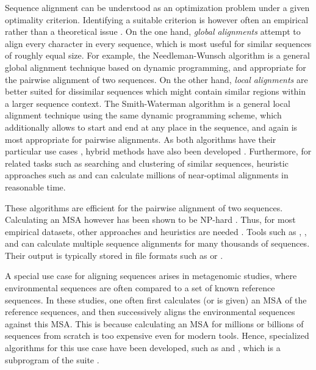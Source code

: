Sequence alignment can be understood as an optimization problem under a given optimality criterion.
Identifying a suitable criterion is however often an empirical rather than a theoretical issue \cite{Vingron1994,Carroll2007}.
On the one hand, \emph{global alignments} attempt to align every character in every sequence,
which is most useful for similar sequences of roughly equal size.
For example, the Needleman-Wunsch algorithm \cite{Needleman1970} is a general global alignment technique
based on dynamic programming, and appropriate for the pairwise alignment of two sequences.
On the other hand, \emph{local alignments} are better suited for dissimilar sequences
which might contain similar regions within a larger sequence context.
The Smith-Waterman algorithm \cite{Smith1981} is a general local alignment technique
using the same dynamic programming scheme,
which additionally allows to start and end at any place in the sequence,
and again is most appropriate for pairwise alignments.
As both algorithms have their particular use cases \cite{Polyanovsky2011},
hybrid methods have also been developed \cite{Brudno2003}.
Furthermore, for related tasks such as searching and clustering of similar sequences,
heuristic approaches such as  \cite{Altschul1990} and
 \cite{Edgar2010} can calculate millions of near-optimal alignments in reasonable time.

These algorithms are efficient for the pairwise alignment of two sequences.
Calculating an MSA however has been shown to be NP-hard \cite{Wang1994,Just2001}.
Thus, for most empirical datasets, other approaches and heuristics are needed \cite{Thompson2011}.
Tools such as  \cite{Higgins1988},  \cite{Edgar2004}, and  \cite{Katoh2002}
can calculate multiple sequence alignments for many thousands of sequences.
Their output is typically stored in file formats
such as  \cite{Pearson1988} or  \cite{Felsenstein1981}.

A special use case for aligning sequences arises in metagenomic studies,
where environmental sequences are often compared to a set of known reference sequences.
In these studies, one often first calculates (or is given) an MSA of the reference sequences,
and then successively aligns the environmental sequences against this MSA.
This is because calculating an MSA for millions or billions of sequences from scratch is too expensive even for modern tools.
Hence, specialized algorithms for this use case have been developed,
such as  \cite{Berger2011a,Berger2012} and
, which is a subprogram of the  suite \cite{Eddy1998,Eddy2009}.

